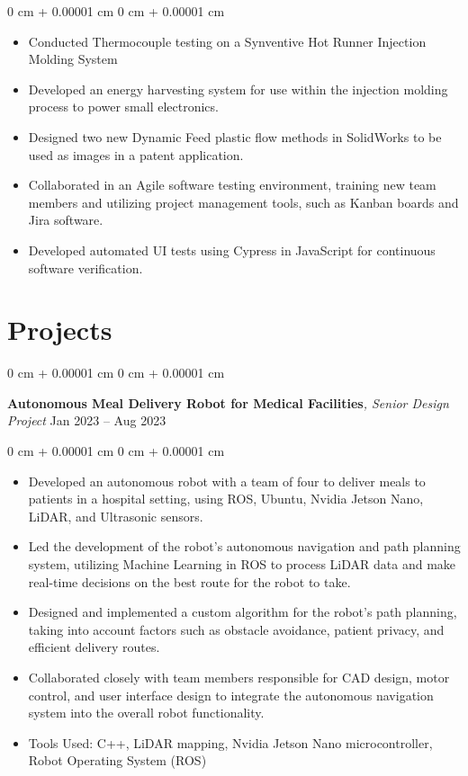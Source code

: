 \documentclass[10pt, letterpaper]{article}
\newenvironment{highlights}{
    \begin{itemize}[
        topsep=0.10 cm,
        parsep=0.10 cm,
        partopsep=0pt,
        itemsep=0pt,
        leftmargin=0 cm + 10pt
    ]
}{
    \end{itemize}
} %
\newenvironment{onecolentry}{
    \begin{adjustwidth}{
        0 cm + 0.00001 cm
    }{
        0 cm + 0.00001 cm
    }
}{
    \end{adjustwidth}
} %
\newenvironment{twocolentry}[2][]{
    \onecolentry
    \def\secondColumn{#2}
    \setcolumnwidth{\fill, 4.5 cm}
    \begin{paracol}{2}
}{
    \switchcolumn \raggedleft \secondColumn
    \end{paracol}
    \endonecolentry
} %
\begin{document}
        \vspace{0.10 cm}
        \begin{onecolentry}
            \begin{highlights}
                \item Conducted Thermocouple testing on a Synventive Hot Runner Injection Molding System
                \item Developed an energy harvesting system for use within the injection molding process to power small electronics.
                \item Designed two new Dynamic Feed plastic flow methods in SolidWorks to be used as images in a patent application.
                \item Collaborated in an Agile software testing environment, training new team members and utilizing project management tools, such as Kanban boards and Jira software.
                \item Developed automated UI tests using Cypress in JavaScript for continuous software verification.
            \end{highlights}
        \end{onecolentry}
            
    \section{Projects}
        \begin{twocolentry}{
           Jan 2023 – Aug 2023
        }
            \textbf{Autonomous Meal Delivery Robot for Medical Facilities}\textit{, Senior Design Project}\end{twocolentry}

        \vspace{0.10 cm}
        \begin{onecolentry}
            \begin{highlights}
                \item Developed an autonomous robot with a team of four to deliver meals to patients in a hospital setting, using ROS, Ubuntu, Nvidia Jetson Nano, LiDAR, and Ultrasonic sensors.
                \item  Led the development of the robot’s autonomous navigation and path planning system, utilizing Machine Learning in ROS to process LiDAR data and make real-time decisions on the best route for the robot to take.
                \item Designed and implemented a custom algorithm for the robot’s path planning, taking into account factors such as obstacle avoidance, patient privacy, and efficient delivery routes.
                \item Collaborated closely with team members responsible for CAD design, motor control, and user interface design to integrate the autonomous navigation system into the overall robot functionality.
                \item Tools Used: C++, LiDAR mapping, Nvidia Jetson Nano microcontroller, Robot Operating System (ROS)
            \end{highlights}
        \end{onecolentry}
\end{document}
